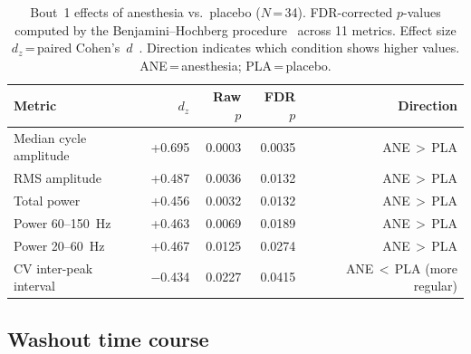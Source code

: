 \begin{table}[h!]
\centering
\caption{Bout~1 effects of anesthesia vs.\ placebo ($N$\,=\,34).
         FDR-corrected $p$-values computed by the Benjamini--Hochberg
         procedure~\cite{Benjamini1995} across 11 metrics.
         Effect size $d_z$\,=\,paired Cohen's~$d$~\cite{Cohen1988}.
         Direction indicates which condition shows higher values.
         ANE\,=\,anesthesia; PLA\,=\,placebo.}
\label{tab:bout1}
\begin{tabular}{lrrrr}
\toprule
Metric                         & $d_z$   & Raw $p$ & FDR $p$ & Direction     \\
\midrule
Median cycle amplitude         & +0.695  & 0.0003  & 0.0035  & ANE\,$>$\,PLA \\
RMS amplitude                  & +0.487  & 0.0036  & 0.0132  & ANE\,$>$\,PLA \\
Total power                    & +0.456  & 0.0032  & 0.0132  & ANE\,$>$\,PLA \\
Power 60--150~Hz               & +0.463  & 0.0069  & 0.0189  & ANE\,$>$\,PLA \\
Power 20--60~Hz                & +0.467  & 0.0125  & 0.0274  & ANE\,$>$\,PLA \\
CV inter-peak interval         & $-$0.434 & 0.0227 & 0.0415  & ANE\,$<$\,PLA (more regular) \\
\bottomrule
\end{tabular}
\end{table}

\subsection*{Washout time course}

